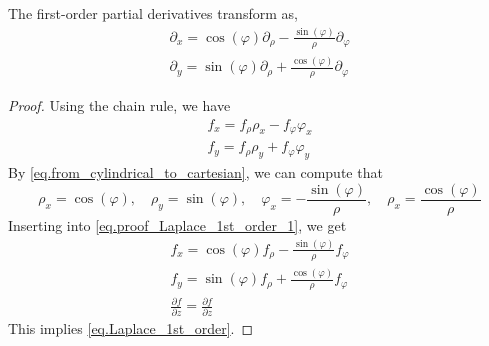 \begin{proposition}[]
The first-order partial derivatives transform as,
\begin{equation}\label{eq.Laplace_1st_order}
    \begin{gathered}
        \partial_x = \cos(\varphi) \partial_\rho - \frac{\sin(\varphi)}{\rho} \partial_\varphi
        \\
        \partial_y = \sin(\varphi) \partial_\rho + \frac{\cos(\varphi)}{\rho} \partial_\varphi
    \end{gathered}
\end{equation}
\end{proposition}
\begin{proof} Using the chain rule, we have
\begin{equation}\label{eq.proof_Laplace_1st_order_1}
    \begin{gathered}
        f_x = f_\rho \rho_x - f_\varphi \varphi_x
        \\
        f_y = f_\rho \rho_y + f_\varphi \varphi_y
    \end{gathered}
\end{equation}
By \eqref{eq.from_cylindrical_to_cartesian}, we can compute that
\begin{equation}
    \rho_x = \cos(\varphi), \quad \rho_y = \sin(\varphi), \quad \varphi_x = - \frac{\sin(\varphi)}{\rho}, \quad \rho_x = \frac{\cos(\varphi)}{\rho}
\end{equation}
Inserting into \eqref{eq.proof_Laplace_1st_order_1}, we get
\begin{equation}
    \begin{gathered}
        f_x = \cos(\varphi) f_\rho - \frac{\sin(\varphi)}{\rho} f_\varphi
        \\
        f_y = \sin(\varphi) f_\rho + \frac{\cos(\varphi)}{\rho} f_\varphi
        \\
        \frac{\partial f}{\partial z} = \frac{\partial f}{\partial z}
    \end{gathered}
\end{equation}
This implies \eqref{eq.Laplace_1st_order}.
\end{proof}


